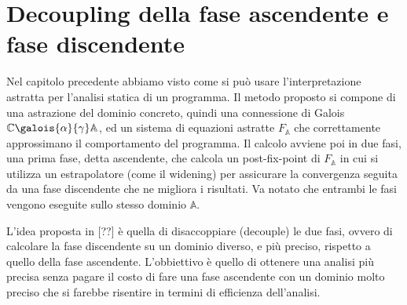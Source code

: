 \chapter{Decoupling della fase ascendente e fase discendente}\label{chapter:decoupling}

Nel capitolo precedente abbiamo visto come si può usare l'interpretazione astratta per l'analisi statica di un programma. Il metodo proposto si compone di una astrazione del dominio concreto, quindi una connessione di Galois \(\mathbb{C}\galois{\alpha}{\gamma}\mathbb{A}\),  ed un sistema di equazioni  astratte \(F_{\mathbb{A}}\) che correttamente approssimano il comportamento del programma. Il calcolo avviene poi in due fasi, una prima fase, detta ascendente, che calcola un post-fix-point di \(F_{\mathbb{A}}\) in cui si utilizza un estrapolatore (come il widening) per assicurare la convergenza seguita da una fase discendente che ne migliora i risultati. Va notato che entrambi le fasi vengono eseguite sullo stesso dominio \(\mathbb{A}\).

L'idea proposta in [??] è quella di disaccoppiare (decouple) le due fasi, ovvero di calcolare la fase discendente su un dominio diverso, e più preciso, rispetto a quello della fase ascendente. L'obbiettivo è quello di ottenere una analisi più precisa senza pagare il costo di fare una fase ascendente con un dominio molto preciso che si farebbe risentire in termini di efficienza dell'analisi.